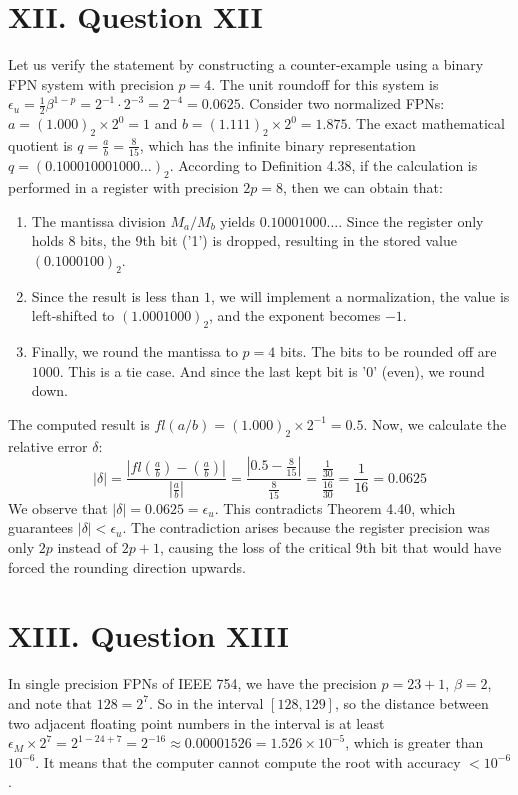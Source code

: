 \documentclass[a4paper]{article}
\begin{document}
\section*{XII. Question XII}

Let us verify the statement by constructing a counter-example using a binary FPN system with precision $p=4$. The unit roundoff for this system is $\epsilon_u = \frac{1}{2}\beta^{1-p} = 2^{-1} \cdot 2^{-3} = 2^{-4} = 0.0625$.\newline
Consider two normalized FPNs: $a = (1.000)_2 \times 2^0 = 1$ and $b = (1.111)_2 \times 2^0 = 1.875$. The exact mathematical quotient is $q = \frac{a}{b} = \frac{8}{15}$, which has the infinite binary representation $q = (0.100010001000\dots)_2$.\newline
According to Definition 4.38, if the calculation is performed in a register with precision $2p = 8$, then we can obtain that:
\begin{enumerate}
    \item The mantissa division $M_a/M_b$ yields $0.10001000\dots$. Since the register only holds 8 bits, the 9th bit ('1') is dropped, resulting in the stored value $(0.1000100)_2$.
    \item Since the result is less than $1$, we will implement a normalization, the value is left-shifted to $(1.0001000)_2$, and the exponent becomes $-1$.
    \item Finally, we round the mantissa to $p=4$ bits. The bits to be rounded off are $1000$. This is a tie case. And since the last kept bit is '0' (even), we round down.
\end{enumerate}
The computed result is $fl(a/b) = (1.000)_2 \times 2^{-1} = 0.5$. Now, we calculate the relative error $\delta$:
\[
|\delta| = \frac{|fl(\frac{a}{b}) - (\frac{a}{b})|}{|\frac{a}{b}|} = \frac{|0.5 - \frac{8}{15}|}{\frac{8}{15}} = \frac{\frac{1}{30}}{\frac{16}{30}} = \frac{1}{16} = 0.0625
\]
We observe that $|\delta| = 0.0625 = \epsilon_u$. 
This contradicts Theorem 4.40, 
which guarantees $|\delta| < \epsilon_u$. 
The contradiction arises because the register precision was only $2p$ instead of $2p+1$, 
causing the loss of the critical 9th bit that would have forced the rounding direction upwards.

\section*{XIII. Question XIII}

In single precision FPNs of IEEE 754, we have the precision $p=23+1$, $\beta = 2$, and note that $128=2^7$. So in the interval $[128,129]$, so the distance between two adjacent floating point numbers in the interval is at least
$\epsilon_M\times 2^7=2^{1-24+7}=2^{-16}\approx0.00001526=1.526\times 10^{-5}$, which is greater than $10^{-6}$. It means that the computer cannot compute the root with accuracy $<10^{-6}$.
\end{document}
